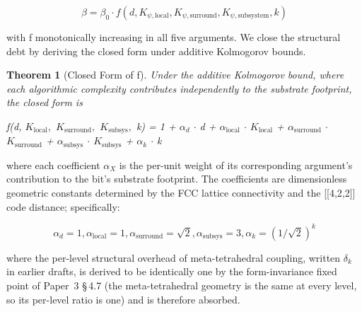 \documentclass[11pt,oneside]{report}
\newtheorem{theorem}{Theorem}[section]
\theoremstyle{definition}
\theoremstyle{remark}
\begin{document}
\begin{equation*}
\beta = \beta_{0} \cdot f(d, K_{\psi,\mathrm{local}}, K_{\psi,\mathrm{surround}}, K_{\psi,\mathrm{subsystem}}, k)
\end{equation*}

with f monotonically increasing in all five arguments. We close the
structural debt by deriving the closed form under additive Kolmogorov
bounds.

\begin{theorem}[Closed Form of f]
Under the additive Kolmogorov
bound, where each algorithmic complexity contributes independently to
the substrate footprint, the closed form is
\end{theorem}

\emph{f(d, \ensuremath{K_{\mathrm{local}},} \ensuremath{K_{\mathrm{surround}},} \ensuremath{K_{\mathrm{subsys}},} k) = 1 + \ensuremath{\alpha_{d}} \ensuremath{\cdot} d +
\ensuremath{\alpha_{\mathrm{local}}} \ensuremath{\cdot} \ensuremath{K_{\mathrm{local}}} + \ensuremath{\alpha_{\mathrm{surround}}} \ensuremath{\cdot} \ensuremath{K_{\mathrm{surround}}} + \ensuremath{\alpha_{\mathrm{subsys}}} \ensuremath{\cdot} \ensuremath{K_{\mathrm{subsys}}}
+ \ensuremath{\alpha_{k}} \ensuremath{\cdot} k}

where each coefficient \ensuremath{\alpha_{X}} is the per-unit weight of its corresponding
argument's contribution to the bit's substrate footprint. The
coefficients are dimensionless geometric constants determined by the FCC
lattice connectivity and the [[4,2,2]] code distance;
specifically:

\begin{equation*}
\alpha_{d} = 1, \alpha_{\mathrm{local}} = 1, \alpha_{\mathrm{surround}} = \sqrt{2}, \alpha_{\mathrm{subsys}} = 3, \alpha_{k} =
(1/\sqrt{2})^{k}
\end{equation*}

where the per-level structural overhead of meta-tetrahedral coupling,
written \ensuremath{\delta_{k}} in earlier drafts, is derived to be identically one by
the form-invariance fixed point of Paper~3 \S\,4.7 (the meta-tetrahedral
geometry is the same at every level, so its per-level ratio is one) and is
therefore absorbed.
\end{document}
